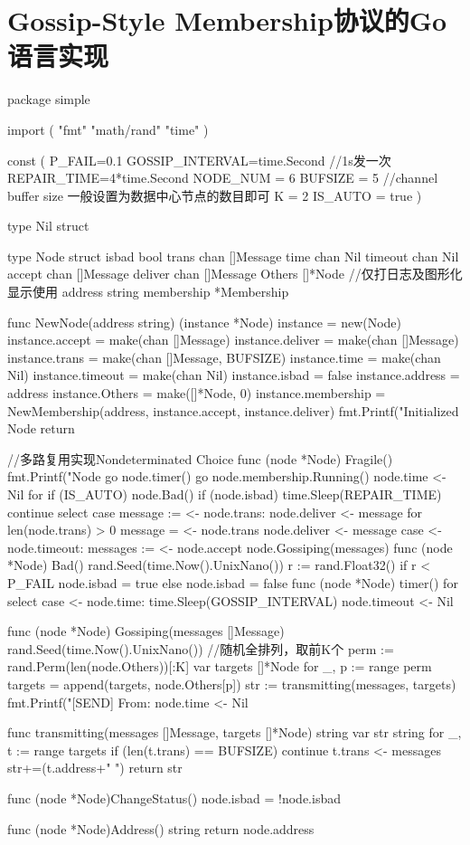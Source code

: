 \chapter{Gossip-Style Membership协议的Go语言实现}\label{app:code}
\begin{codeblock}[language=GO]
    package simple

import (
	"fmt"
	"math/rand"
	"time"
)

const (
	P_FAIL=0.1
	GOSSIP_INTERVAL=time.Second //1s发一次
	REPAIR_TIME=4*time.Second
	NODE_NUM = 6
	BUFSIZE = 5 //channel buffer size 一般设置为数据中心节点的数目即可
	K = 2
	IS_AUTO = true
)

type Nil struct {}

type Node struct {
	isbad bool
	trans chan []Message
	time chan Nil
	timeout chan Nil
	accept chan []Message
	deliver chan []Message
	Others []*Node
	//仅打日志及图形化显示使用
	address string
	membership *Membership
}

func NewNode(address string) (instance *Node) {
	instance = new(Node)
	instance.accept = make(chan []Message)
	instance.deliver = make(chan []Message)
	instance.trans = make(chan []Message, BUFSIZE)
	instance.time = make(chan Nil)
	instance.timeout = make(chan Nil)
	instance.isbad = false
	instance.address = address
	instance.Others = make([]*Node, 0)
	instance.membership = NewMembership(address, instance.accept, instance.deliver)
	fmt.Printf("Initialized Node %
	return
}

//多路复用实现Nondeterminated Choice
func (node *Node) Fragile() {
	fmt.Printf("Node %
	go node.timer()
	go node.membership.Running()
	node.time <- Nil{}
	for {
		if (IS_AUTO) {
			node.Bad()
		}
		if (node.isbad) {
			time.Sleep(REPAIR_TIME)
			continue
		}
		select {
		case message := <- node.trans:
			node.deliver <- message
			for len(node.trans) > 0 {
				message = <- node.trans
				node.deliver <- message
			}
		case <- node.timeout:
			messages := <- node.accept
			node.Gossiping(messages)
		}
	}
}
func (node *Node) Bad() {
	rand.Seed(time.Now().UnixNano())
		r := rand.Float32()
		if r < P_FAIL {
			node.isbad = true
		} else {
			node.isbad = false
		}
}
func (node *Node) timer() {
	for {
		select {
		case <- node.time:
			time.Sleep(GOSSIP_INTERVAL)
			node.timeout <- Nil{}
		}
	}
}

func (node *Node) Gossiping(messages []Message) {
	rand.Seed(time.Now().UnixNano())
	//随机全排列，取前K个
	perm := rand.Perm(len(node.Others))[:K]
	var targets []*Node
	for _, p := range perm {
		targets = append(targets, node.Others[p])
	}
	str := transmitting(messages, targets)
	fmt.Printf("[SEND] From: %
	node.time <- Nil{}
}

func transmitting(messages []Message, targets []*Node) string {
	var str string
	for _, t := range targets {
		if (len(t.trans) == BUFSIZE) {
			continue
		}
		t.trans <- messages
		str+=(t.address+" ")
	}
	return str
}

func (node *Node)ChangeStatus() {
	node.isbad = !node.isbad
}

func (node *Node)Address() string {
	return node.address
}
\end{codeblock}

